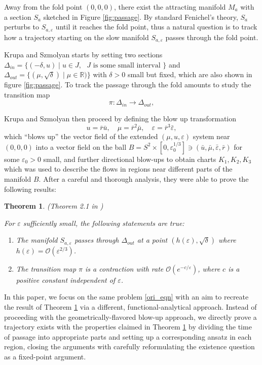 \documentclass[letterpaper,11pt]{article}
\newcommand{\rmO}{\mathcal{O}}
\newcommand{\eps}{\varepsilon}
\numberwithin{equation}{section}
\theoremstyle{plain}
\newtheorem{theorem}{Theorem}[section]
\begin{document}
 Away from the fold point $(0,0,0)$, there exist the attracting manifold $M_a$ with a section $S_a$ sketched in Figure \ref{fig:passage}. By standard Fenichel's theory, $S_a$ perturbs to $S_{a,\eps}$ until it reaches the fold point, thus a natural question is to track how a trajectory starting on the slow manifold $S_{a,\eps}$ passes through the fold point.

Krupa and Szmolyan starts by setting two sections $\Delta_{in} = \{(-\delta, u) \mid u\in J,\text{ $J$ is some small interval }\}$ and $\Delta_{out} = \{( \mu ,\sqrt{\delta})\mid \mu \in \mathbb{R})\}$ with $\delta>0$ small but fixed, which are also shown in figure \ref{fig:passage}. To track the passage through the fold amounts to study the transition map 
\[
\pi: \Delta_{in} \to \Delta_{out},
\]

Krupa and Szmolyan then proceed by defining the blow up transformation
\[
u =\bar{r} \bar{u},  \quad \mu = \bar{r}^2 \bar{\mu}, \quad  \eps = \bar{r}^3 \bar{\eps},
\]
which ``blows up'' the vector field of the extended $(\mu, u, \eps)$ system near $(0,0,0)$ into a vector field on the ball $B = S^2 \times [0,\eps_0^{1/3}] \ni (\bar{u}, \bar{\mu}, \bar{\eps}, \bar{r})$ for some $\eps_0>0$ small, and further directional blow-ups to obtain charts $K_1,K_2,K_3$ which was used to describe the flows in regions near different parts of the manifold $B$. After a careful and thorough analysis, they were able to prove the following results:
\begin{theorem}\label{ks_main}(Theorem 2.1 in \cite{KrupaSz})

For $\eps$ sufficiently small, the following statements are true:
\begin{enumerate}
\item The manifold $S_{a,\eps} $ passes through  $\Delta_{out}$ at a point $(h(\eps), \sqrt{\delta})$ where $h(\eps) = \rmO(\eps^{2/3})$.
\item The transition map $\pi$ is a contraction with rate $\rmO(e^{-c/\eps} )$, where $c$ is a positive constant independent of $\eps$.
\end{enumerate}
\end{theorem}


In this paper, we focus on the same problem \eqref{ori_eqn} with an aim to recreate the result of Theorem \ref{ks_main} via a different, functional-analytical approach. Instead of proceeding with the geometrically-flavored blow-up approach, we directly prove a trajectory exists with the properties claimed in Theorem \ref{ks_main} by dividing the time of passage into appropriate parts and setting up a corresponding ansatz in each region, closing the arguments with carefully reformulating the existence question as a fixed-point argument.
\end{document}
